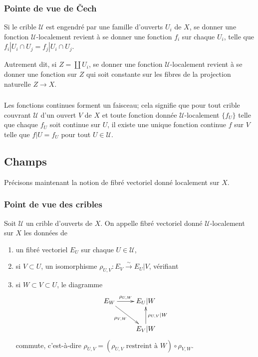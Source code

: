 \documentclass{article}
\newcommand{\cU}{\mathcal{U}}
\newcommand{\iso}{\xrightarrow\sim}
\begin{document}
\subsubsection{Pointe de vue de Čech}\label{1-2-2}

Si le crible $\cU$ est engendré par une famille d'ouverts $U_i$ de $X$, se 
donner une fonction $\cU$-localement revient à se donner une fonction $f_i$ 
sur chaque $U_i$, telle que $f_i|{U_i\cap U_j} = f_j|{U_i\cap U_j}$. 

Autrement dit, si $Z=\coprod U_i$, se donner une fonction $\cU$-localement 
revient à se donner une fonction sur $Z$ qui soit constante sur les fibres de 
la projection naturelle $Z\to X$. 





\subsubsection{}\label{1-2-3}

Les fonctions continues forment un faisceau; cela signifie que pour tout crible 
couvrant $\cU$ d'un ouvert $V$ de $X$ et toute fonction donnée 
$\cU$-localement $\{f_U\}$ telle que chaque $f_U$ soit continue sur $U$, il 
existe une unique fonction continue $f$ sur $V$ telle que $f|U=f_U$ pour tout 
$U\in \cU$.










\subsection{Champs}\label{1-3}

Précisons maintenant la notion de fibré vectoriel donné localement sur $X$. 





\subsubsection{Point de vue des cribles}\label{1-3-1}

Soit $\cU$ un crible d'ouverts de $X$. On appelle fibré vectoriel donné 
$\cU$-localement sur $X$ les données de 
\begin{enumerate}[\indent a)]
  \item un fibré vectoriel $E_U$ sur chaque $U\in \cU$, 
  \item si $V\subset U$, un isomorphisme $\rho_{U,V} : E_V\iso E_U|V$, vérifiant 
  \item si $W\subset V\subset U$, le diagramme 
    \[\xymatrix{
      E_W \ar[r]^-{\rho_{U,W}} \ar[dr]_-{\rho_{V,W}}
        & E_U|W \\
      & E_V|W \ar[u]_-{\rho_{U,V}|W}
    }\]
    commute, c'est-à-dire 
    $\rho_{U,V} = (\mbox{$\rho_{U,V}$ restreint à $W$}) \circ \rho_{V,W}$. 
\end{enumerate}
\end{document}
